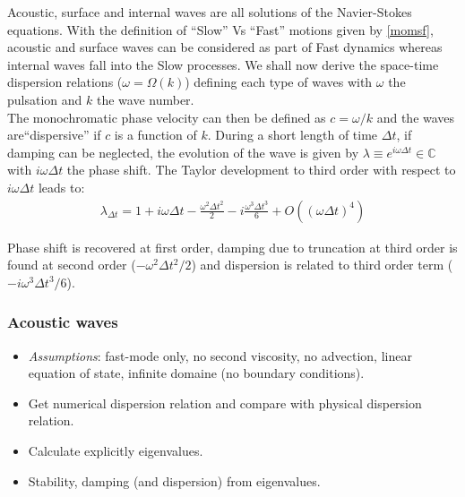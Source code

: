 \documentclass[a4paper]{article}
\numberwithin{equation}{section}
\begin{document}
Acoustic, surface and internal waves are all solutions of the Navier-Stokes equations. With the definition of ``Slow'' Vs ``Fast'' motions given by \ref{momsf}, acoustic and surface waves can be considered as part of Fast dynamics whereas internal waves fall into the Slow processes. We shall now derive the space-time dispersion relations ($\omega=\Omega(k)$) defining each type of waves with $\omega$ the pulsation and $k$ the wave number.\\
The monochromatic phase velocity can then be defined as $c=\omega / k$ and the waves are``dispersive'' if $c$ is a function of $k$. During a short length of time $\Delta t$, if damping can be neglected, the evolution of the wave is given by $\lambda \equiv e^{i \omega \Delta t} \in  \mathbb{C}$ with $i \omega \Delta t$ the phase shift. The Taylor development to third order with respect to $i\omega\Delta t$ leads to:
  \begin{equation}
    \label{lambda3}
    \begin{split}
      \displaystyle
      \lambda_{\Delta t}=1+i\omega\Delta{t}-\frac{\omega^2\Delta{t}^2}{2}
      -i\frac{\omega^3\Delta{t}^3}{6}+O((\omega\Delta{t})^4)
    \end{split}
    \end{equation}

Phase shift is recovered at first order, damping due to truncation at third order is found at second order ($-\omega^2\Delta{t}^2/2$) and dispersion is related to third order term ($-i\omega^3\Delta{t}^3/6$).
    
 \subsubsection{Acoustic waves}
 \begin{itemize}[label=\textbullet,font=\tiny]
   \item \textit{Assumptions}: fast-mode only, no second viscosity, no advection, linear equation of state, infinite domaine (no boundary conditions).
   \item Get numerical dispersion relation and compare with physical dispersion relation.
   \item Calculate explicitly eigenvalues.
   \item Stability, damping (and dispersion) from eigenvalues.\\
\end{itemize}
  
\end{document}
